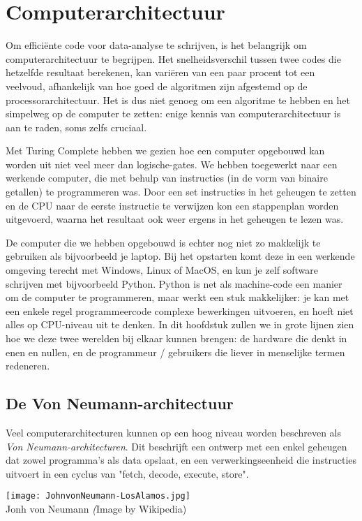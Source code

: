 \chapter{Computerarchitectuur}
Om efficiënte code voor data-analyse te schrijven, is het belangrijk om computerarchitectuur te begrijpen. Het snelheidsverschil tussen twee codes die hetzelfde resultaat berekenen, kan variëren van een paar procent tot een veelvoud, afhankelijk van hoe goed de algoritmen zijn afgestemd op de processorarchitectuur. Het is dus niet genoeg om een algoritme te hebben en het simpelweg op de computer te zetten: enige kennis van computerarchitectuur is aan te raden, soms zelfs cruciaal.

Met Turing Complete hebben we gezien hoe een computer opgebouwd kan worden uit niet veel meer dan logische-gates. We hebben toegewerkt naar een werkende computer, die met behulp van instructies (in de vorm van binaire getallen) te programmeren was. Door een set instructies in het geheugen te zetten en de CPU naar de eerste instructie te verwijzen kon een stappenplan worden uitgevoerd, waarna het resultaat ook weer ergens in het geheugen te lezen was.

De computer die we hebben opgebouwd is echter nog niet zo makkelijk te gebruiken als bijvoorbeeld je laptop. Bij het opstarten komt deze in een werkende omgeving terecht met Windows, Linux of MacOS, en kun je zelf software schrijven met bijvoorbeeld Python. Python is net als machine-code een manier om de computer te programmeren, maar werkt een stuk makkelijker: je kan met een enkele regel programmeercode complexe bewerkingen uitvoeren, en hoeft niet alles op CPU-niveau uit te denken. In dit hoofdstuk zullen we in grote lijnen zien hoe we deze twee werelden bij elkaar kunnen brengen: de hardware die denkt in enen en nullen, en de programmeur / gebruikers die liever in menselijke termen redeneren.

\section{De Von Neumann-architectuur}\label{sec:vonneuman }
Veel computerarchitecturen kunnen op een hoog niveau worden beschreven als \textit{Von Neumann-architecturen}. Dit beschrijft een ontwerp met een enkel geheugen dat zowel programma's als data opslaat, en een verwerkingseenheid die instructies uitvoert in een cyclus van "fetch, decode, execute, store".
  \begin{marginfigure}
\texttt{[image: JohnvonNeumann-LosAlamos.jpg]}\\
    Jonh von Neumann {\scriptsize\emph (Image by Wikipedia)}\\[3mm]
  \end{marginfigure}

